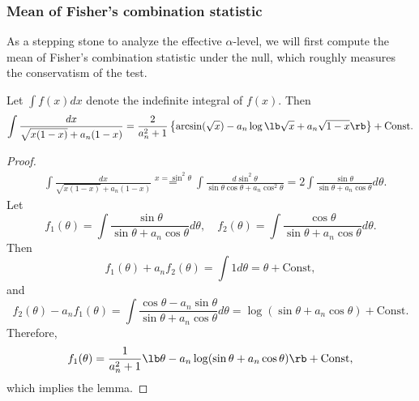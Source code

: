 \subsubsection{Mean of Fisher's combination statistic}
As a stepping stone to analyze the effective $\alpha$-level, we will first compute the mean of Fisher's combination statistic under the null, which roughly measures the conservatism of the test.
\begin{lemma}\label{lem:integral}
  Let $\int f(x)dx$ denote the indefinite integral of $f(x)$. Then
  \[\int \frac{dx}{\sqrt{x(1-x)} + a_n(1 - x)} = \frac{2}{a_n^2 + 1}\left\{ \arcsin(\sqrt{x}) - a_n \log\lb \sqrt{x} + a_n\sqrt{1 - x}\rb\right\} + \mathrm{Const}.\]
\end{lemma}
\begin{proof}
  \begin{align*}
    &\int \frac{dx}{\sqrt{x(1-x)} + a_n(1 - x)} \stackrel{x = \sin^2\theta}{=}\int \frac{d\sin^2\theta}{\sin\theta \cos\theta + a_n\cos^2\theta} = 2\int \frac{\sin\theta}{\sin\theta + a_n \cos\theta}d\theta.
  \end{align*}
  Let
  \[f_1(\theta) = \int \frac{\sin\theta}{\sin\theta + a_n \cos\theta}d\theta, \quad f_2(\theta) = \int \frac{\cos\theta}{\sin\theta + a_n \cos\theta}d\theta.\]
  Then
  \[f_1(\theta) + a_n f_2(\theta) = \int 1d\theta = \theta + \mathrm{Const},\]
  and
  \[f_2(\theta) - a_n f_1(\theta) = \int \frac{\cos\theta - a_n \sin\theta}{\sin\theta + a_n \cos\theta}d\theta = \log(\sin\theta + a_n \cos\theta) + \mathrm{Const}.\]
  Therefore,
  \[f_1(\theta) = \frac{1}{a_n^2 + 1}\lb \theta - a_n\log(\sin\theta + a_n \cos\theta)\rb + \mathrm{Const},\]
  which implies the lemma.
\end{proof}

